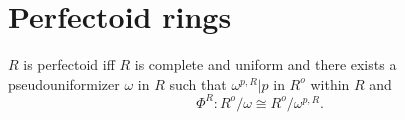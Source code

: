 \documentclass{article}
\begin{document}
\section{Perfectoid rings}

\begin{forthel}
  \begin{definition}
    $R$ is perfectoid iff $R$ is complete and uniform and there exists a pseudouniformizer $\omega$ in $R$
    such that $\omega^{p,R} | p$ in $R^o$ within $R$ and \[ \Phi^{R} : R^o / \omega \cong R^o / \omega^{p,R}. \]
  \end{definition}
\end{forthel}
\end{document}
